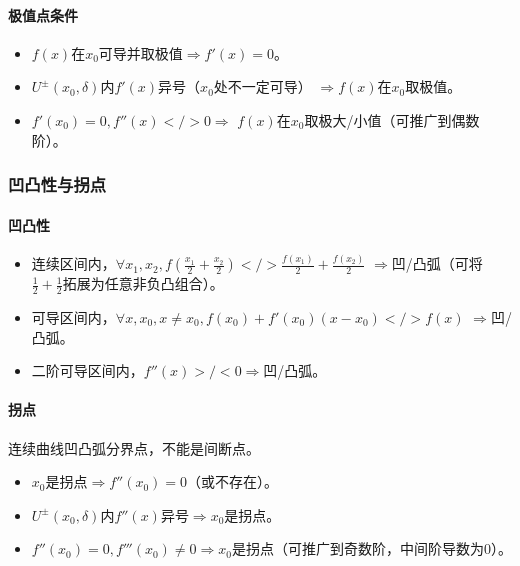 \documentclass[
12pt, %
a4paper, 
oneside, %
headinclude,footinclude, %
]{scrartcl}
\begin{document}
\paragraph{极值点条件}
\begin{itemize}
\item $ f(x) $在$ x_0 $可导并取极值$ \Rightarrow $$ f'(x) = 0 $。
\item $ U^\pm (x_0, \delta) $内$ f'(x) $异号（$ x_0 $处不一定可导）
$ \Rightarrow $$ f(x) $在$ x_0 $取极值。
\item $ f'(x_0) = 0 , f''(x) </> 0 $$ \Rightarrow $
$ f(x) $在$ x_0 $取极大/小值（可推广到偶数阶）。
\end{itemize}
\subsubsection{凹凸性与拐点}
\paragraph{凹凸性}
\begin{itemize}
\item 连续区间内，$ \forall x_1,x_2, f(\frac{x_1}{2} + \frac{x_2}{2}) </> \frac{f(x_1)}{2} + \frac{f(x_2)}{2} $
$ \Rightarrow $凹/凸弧（可将$ \frac{1}{2} + \frac{1}{2} $拓展为任意非负凸组合）。
\item 可导区间内，$ \forall x,x_0, x \neq x_0, f(x_0) + f'(x_0) (x - x_0) </> f(x) $
$ \Rightarrow $凹/凸弧。
\item 二阶可导区间内，$ f''(x) >/< 0 $$ \Rightarrow $凹/凸弧。
\end{itemize}
\paragraph{拐点}
连续曲线凹凸弧分界点，不能是间断点。
\begin{itemize}
\item $ x_0 $是拐点$ \Rightarrow $$ f''(x_0) = 0 $（或不存在）。
\item $ U^{\pm}(x_0, \delta) $内$ f''(x) $异号$ \Rightarrow $$ x_0 $是拐点。
\item $ f''(x_0) = 0, f'''(x_0) \neq 0 $$ \Rightarrow $$ x_0 $是拐点（可推广到奇数阶，中间阶导数为$ 0 $）。
\end{itemize}
\end{document}
